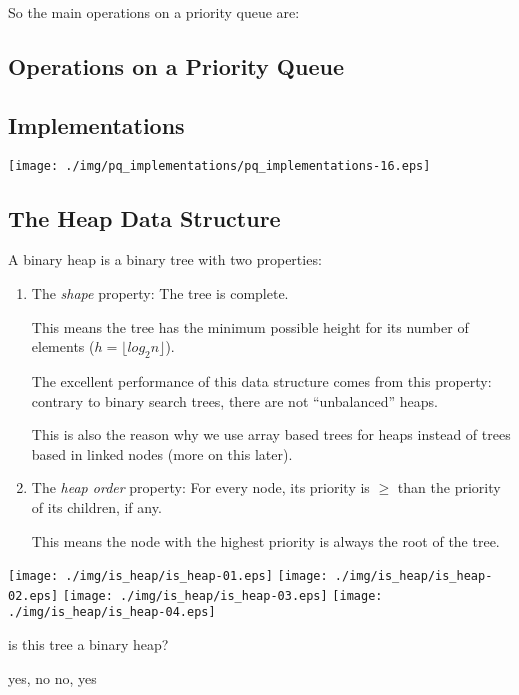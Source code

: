 \documentclass[a4paper, 9pt]{extarticle}
\begin{document}
So the main operations on a priority queue are:


\subsection{Operations on a Priority Queue}


\subsection{Implementations}

\begin{center}
  \texttt{[image: ./img/pq\_implementations/pq\_implementations-16.eps]}
\end{center}


\subsection{The Heap Data Structure}

A binary heap is a binary tree with two properties:

\begin{enumerate}

  \item The \emph{shape} property: The tree is complete.

    This means the tree has the minimum possible height for its number of
    elements ($h = \lfloor log_{2} n \rfloor$).

    The excellent performance of this data structure comes from this property:
    contrary to binary search trees, there are not ``unbalanced'' heaps.

    This is also the reason why we use array based trees for heaps instead of
    trees based in linked nodes (more on this later).

  \item The \emph{heap order} property: For every node, its priority is $\ge$ than the
    priority of its children, if any.

    This means the node with the highest priority is always the root of the tree.

\end{enumerate}

\begin{center}
  \texttt{[image: ./img/is\_heap/is\_heap-01.eps]}
  \texttt{[image: ./img/is\_heap/is\_heap-02.eps]}
  \texttt{[image: ./img/is\_heap/is\_heap-03.eps]}
  \texttt{[image: ./img/is\_heap/is\_heap-04.eps]}
\end{center}

\begin{blackboard}
  is this tree a binary heap?

  yes, no
  no, yes
\end{blackboard}
\end{document}

